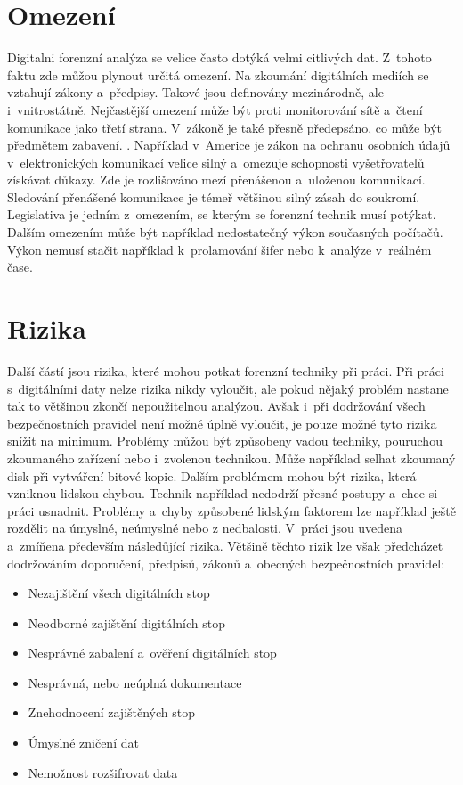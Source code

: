 \documentclass[thesis=B,czech]{FITthesis}[2012/06/26]
\begin{document}
\section{Omezení}

Digitalni forenzní analýza se velice často dotýká velmi citlivých dat. Z~tohoto faktu zde můžou plynout určitá omezení. Na zkoumání  digitálních mediích se vztahují zákony a~předpisy. Takové jsou definovány mezinárodně, ale i~vnitrostátně. Nejčastější omezení může být proti monitorování sítě a~čtení komunikace jako třetí strana. V~zákoně je také přesně předepsáno, co může být předmětem zabavení. \cite{for_wi}. Například v~Americe je zákon na ochranu osobních údajů v~elektronických komunikací velice silný a~omezuje schopnosti vyšetřovatelů získávat důkazy. Zde je rozlišováno mezí přenášenou a~uloženou komunikací. Sledování přenášené komunikace je témeř většinou silný zásah do soukromí. Legislativa je jedním z~omezením, se kterým se forenzní technik musí potýkat. Dalším omezením může být například nedostatečný výkon současných počítačů. Výkon nemusí stačit například k~prolamování šifer nebo k~analýze v~reálném čase. 


\section{Rizika}
Další částí jsou rizika, které mohou potkat forenzní techniky při práci. Při práci s~digitálními daty nelze rizika nikdy vyloučit, ale pokud nějaký problém nastane tak to většinou zkončí nepoužitelnou analýzou. Avšak i~při dodržování všech bezpečnostních pravidel není možné úplně vyloučit, je pouze možné tyto rizika snížit na minimum. Problémy můžou být způsobeny vadou techniky, pouruchou zkoumaného zařízení nebo i~zvolenou technikou. Může například selhat zkoumaný disk při vytváření bitové kopie. Dalším problémem mohou být rizika, která vzniknou lidskou chybou. Technik například nedodrží přesné postupy a~chce si práci usnadnit. Problémy a~chyby způsobené lidským faktorem lze například ještě rozdělit na úmyslné, neúmyslné nebo z nedbalosti. V~práci \cite{for_baka} jsou uvedena a~zmíňena především následůjící rizika. Většině těchto rizik lze však předcházet dodržováním doporučení, předpisů, zákonů a~obecných bezpečnostních pravidel:

\begin{itemize}
\item Nezajištění všech digitálních stop
\item Neodborné zajištění digitálních stop
\item Nesprávné zabalení a~ověření digitálních stop
\item Nesprávná, nebo neúplná dokumentace
\item Znehodnocení zajištěných stop
\item Úmyslné zničení dat
\item Nemožnost rozšifrovat data

\end{itemize}
\end{document}
